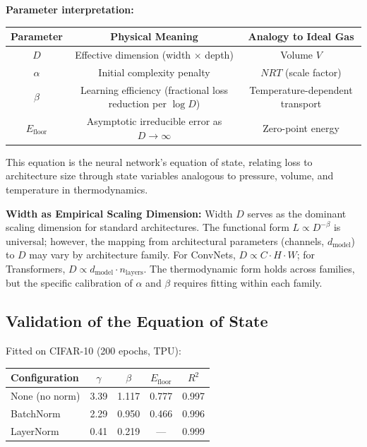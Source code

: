 \documentclass[11pt, a4paper]{article}
\theoremstyle{plain}
\begin{document}
\textbf{Parameter interpretation:}

\begin{center}
\begin{tabular}{ccc}
\toprule
Parameter & Physical Meaning & Analogy to Ideal Gas \\
\midrule
$D$ & Effective dimension (width $\times$ depth) & Volume $V$ \\
$\alpha$ & Initial complexity penalty & $NRT$ (scale factor) \\
$\beta$ & Learning efficiency (fractional loss reduction per $\log D$) & Temperature-dependent transport \\
$E_{\mathrm{floor}}$ & Asymptotic irreducible error as $D \to \infty$ & Zero-point energy \\
\bottomrule
\end{tabular}
\end{center}

This equation is the neural network's equation of state, relating loss to architecture size through state variables analogous to pressure, volume, and temperature in thermodynamics.

\medskip\noindent\textbf{Width as Empirical Scaling Dimension:} Width $D$ serves as the dominant scaling dimension for standard architectures. The functional form $L \propto D^{-\beta}$ is universal; however, the mapping from architectural parameters (channels, $d_{\mathrm{model}}$) to $D$ may vary by architecture family. For ConvNets, $D \propto C \cdot H \cdot W$; for Transformers, $D \propto d_{\mathrm{model}} \cdot n_{\mathrm{layers}}$. The thermodynamic form holds across families, but the specific calibration of $\alpha$ and $\beta$ requires fitting within each family.

\subsection{Validation of the Equation of State}

Fitted on CIFAR-10 (200 epochs, TPU):

\begin{center}
\begin{tabular}{lcccc}
\toprule
Configuration & $\gamma$ & $\beta$ & $E_{\mathrm{floor}}$ & $R^2$ \\
\midrule
None (no norm) & 3.39 & 1.117 & 0.777 & 0.997 \\
BatchNorm & 2.29 & 0.950 & 0.466 & 0.996 \\
LayerNorm & 0.41 & 0.219 & — & 0.999 \\
\bottomrule
\end{tabular}
\end{center}
\end{document}
